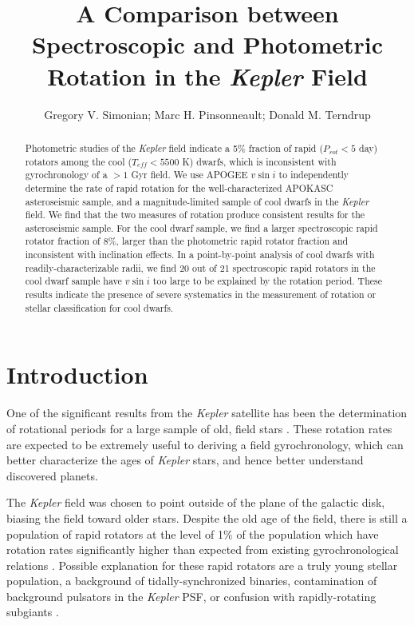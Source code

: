 \documentclass[manuscript]{aastex6}
\newcommand{\vsini}{\ensuremath{v \sin i}}
\newcommand{\Kepler}{\mbox{\textit{Kepler}}}
\newcommand{\Teff}{\ensuremath{T_{eff}}}
\begin{document}
\title{A Comparison between Spectroscopic and Photometric Rotation in the
\Kepler{} Field}
\author{Gregory V. Simonian; Marc H. Pinsonneault; Donald M. Terndrup}

\begin{abstract}
    Photometric studies of the \Kepler{} field indicate a 5\% fraction of rapid
    (\(P_{rot} < 5\) day) rotators among the cool (\(\Teff < 5500\) K) dwarfs, 
    which is inconsistent with gyrochronology of a \(> 1\) Gyr field. We use 
    APOGEE \vsini{} to independently determine the rate of rapid rotation for
    the well-characterized APOKASC asteroseismic sample, and a magnitude-limited 
    sample of cool dwarfs in the \Kepler{} field. We find that the two measures
    of rotation produce consistent results for the asteroseismic sample. For
    the cool dwarf sample, we find a larger spectroscopic rapid rotator
    fraction of 8\%, larger than the photometric rapid rotator fraction and
    inconsistent with inclination effects. In a point-by-point analysis of cool 
    dwarfs with readily-characterizable radii, we find 20 out of 21 
    spectroscopic rapid rotators in the cool dwarf sample have \vsini{} too large 
    to be explained by the rotation period. These results indicate the 
    presence of severe systematics in the measurement of rotation or stellar
    classification for cool dwarfs.
\end{abstract}

\section{Introduction}

One of the significant results from the \Kepler{} satellite has been the
determination of rotational periods for a large sample of old, field stars
\citep{Basri11,Affer12,Nielsen13,Reinhold13,McQuillan14,Garcia14}.
These rotation rates are expected to be extremely useful to deriving a field
gyrochronology, which can better characterize the ages of
\Kepler{} stars, and hence better understand discovered planets.

The \Kepler{} field was chosen to point outside of the plane of the galactic
disk, biasing the field toward older stars. Despite the old age of the
field, there is still a population of rapid rotators at the level of 1\% of the
population which have rotation rates significantly higher than expected from
existing gyrochronological relations \citep{McQuillan14}. Possible explanation
for these rapid rotators are a truly young stellar population, a background of
tidally-synchronized binaries, contamination of background pulsators in the
\Kepler{} PSF, or confusion with rapidly-rotating subgiants \citep{vanSaders13}. 
\end{document}
